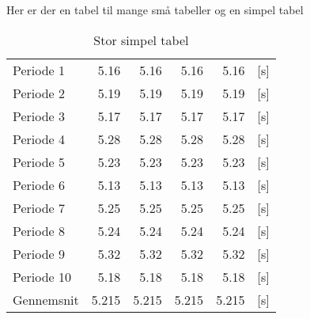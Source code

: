 \clearpage
Her er der en tabel til mange små tabeller og en simpel tabel\\
\begin{table}[h]
  \begin{tabular}{lrrrrl}
  Periode 1  &  5.16  &  5.16  &  5.16  &  5.16  & [s]\\
  Periode 2  &  5.19  &  5.19  &  5.19  &  5.19  & [s]\\
  Periode 3  &  5.17  &  5.17  &  5.17  &  5.17  & [s]\\
  Periode 4  &  5.28  &  5.28  &  5.28  &  5.28  & [s]\\
  Periode 5  &  5.23  &  5.23  &  5.23  &  5.23  & [s]\\
  Periode 6  &  5.13  &  5.13  &  5.13  &  5.13  & [s]\\
  Periode 7  &  5.25  &  5.25  &  5.25  &  5.25  & [s]\\
  Periode 8  &  5.24  &  5.24  &  5.24  &  5.24  & [s]\\
  Periode 9  &  5.32  &  5.32  &  5.32  &  5.32  & [s]\\
  Periode 10 &  5.18  &  5.18  &  5.18  &  5.18  & [s]\\
  Gennemsnit &  5.215 &  5.215 &  5.215 &  5.215 & [s]\\
  \end{tabular}
  \caption{Stor simpel tabel}
\end{table}

